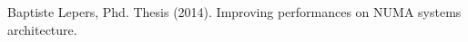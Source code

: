 \begin{thebibliography}{99} %

 Baptiste Lepers, Phd. Thesis (2014). Improving
  performances on NUMA systems architecture.
\end{thebibliography}
